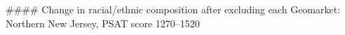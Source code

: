 #### Change in racial/ethnic composition after excluding each Geomarket: Northern New Jersey, PSAT score 1270–1520
